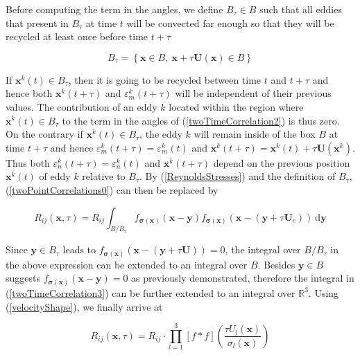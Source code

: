 \noindent Before computing the term in the angles, we define $B_{\tau} \in B$  such that all eddies that present in $B_{\tau}$ at time $t$ will be convected far enough so that they will be recycled at least once before time $t+\tau$

\begin{equation}
B_{\tau} = \left\{\boldsymbol{x}\in B, \ \boldsymbol{x}+\tau \boldsymbol{U}(\boldsymbol{x}) \in B \right\}
\end{equation}

\noindent If $\boldsymbol{x}^k(t)\in B_{\tau}$, then it is going to be recycled between time $t$ and $t+\tau$ and hence both $\boldsymbol{x}^k(t+\tau)$ and $\varepsilon_m^k(t+\tau)$ will be independent of their previous values. The contribution of an eddy $k$ located within the region where $\boldsymbol{x}^k(t) \in B_{\tau}$ to the term in the angles of (\ref{twoTimeCorrelation2}) is thus zero. On the contrary if $\boldsymbol{x}^k(t) \in B_{\tau}$, the eddy $k$ will remain inside of the box $B$ at time $t + \tau$ and hence $\varepsilon_m^k(t+\tau) =  \varepsilon_m^k(t)$ and $\boldsymbol{x}^k(t+\tau) =\boldsymbol{x}^k(t)+\tau\boldsymbol{U}(\boldsymbol{x}^k)$. Thus both $\varepsilon_n^k(t+\tau) =  \varepsilon_n^k(t)$ and $\boldsymbol{x}^k(t+\tau)$ depend on the previous position $\boldsymbol{x}^k(t)$ of eddy $k$ relative to $B_{\tau}$. By (\ref{ReynoldsStresses}) and the definition of $B_{\tau}$, (\ref{twoPointCorrelations0}) can then be replaced by

\begin{equation} \label{twoTimeCorrelation3}
R_{ij}(\boldsymbol{x},\tau) = R_{ij} \int_{B/B_{\tau}}f_{\boldsymbol{\sigma}(\boldsymbol{x})}(\boldsymbol{x}-\boldsymbol{y}) f_{\boldsymbol{\sigma}(\boldsymbol{x})}(\boldsymbol{x}-(\boldsymbol{y}+\tau\boldsymbol{U}_c)) \ \mathrm{d}\boldsymbol{y}
\end{equation}

\noindent Since $\boldsymbol{y}\in B_{\tau}$ leads to $f_{\boldsymbol{\sigma}(\boldsymbol{x})}(\boldsymbol{x}-(\boldsymbol{y}+\tau\boldsymbol{U}))=0$, the integral over $B/B_{\tau}$ in the above expression can be extended to an integral over $B$. Besides $\boldsymbol{y}\in B$ suggests $f_{\boldsymbol{\sigma}(\boldsymbol{x})}(\boldsymbol{x}-\boldsymbol{y})=0$ as previously demonstrated, therefore the integral in (\ref{twoTimeCorrelation3}) can be further extended to an integral over $\mathbb{R}^3$. Using (\ref{velocityShape}), we finally arrive at

\begin{equation} \label{twoTimeCorrelation4}
R_{ij}(\boldsymbol{x},\tau) = R_{ij} \cdot \prod_{l=1}^3[f*f]\left(\frac{\tau U_{l}(\boldsymbol{x})}{\sigma_l(\boldsymbol{x})}\right)
\end{equation}

